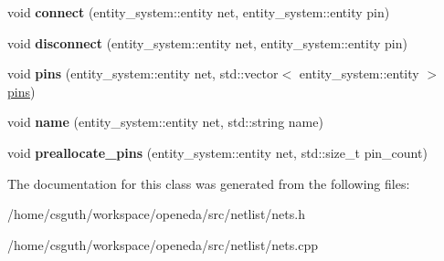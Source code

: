 \begin{DoxyCompactItemize}
\item 
\hypertarget{classophidian_1_1netlist_1_1nets_afe4fb6dd59ab36b9d6619223f9e5dbab}{void {\bfseries connect} (entity\-\_\-system\-::entity net, entity\-\_\-system\-::entity pin)}\label{classophidian_1_1netlist_1_1nets_afe4fb6dd59ab36b9d6619223f9e5dbab}

\item 
\hypertarget{classophidian_1_1netlist_1_1nets_a903c66cc5a191f8d0916a9719618f7df}{void {\bfseries disconnect} (entity\-\_\-system\-::entity net, entity\-\_\-system\-::entity pin)}\label{classophidian_1_1netlist_1_1nets_a903c66cc5a191f8d0916a9719618f7df}

\item 
\hypertarget{classophidian_1_1netlist_1_1nets_a24ef9c3e4d174ac7930f88b94f52ee43}{void {\bfseries pins} (entity\-\_\-system\-::entity net, std\-::vector$<$ entity\-\_\-system\-::entity $>$ \hyperlink{classophidian_1_1netlist_1_1pins}{pins})}\label{classophidian_1_1netlist_1_1nets_a24ef9c3e4d174ac7930f88b94f52ee43}

\item 
\hypertarget{classophidian_1_1netlist_1_1nets_a933f9efaecb385ca94e15abd2a6e448a}{void {\bfseries name} (entity\-\_\-system\-::entity net, std\-::string name)}\label{classophidian_1_1netlist_1_1nets_a933f9efaecb385ca94e15abd2a6e448a}

\item 
\hypertarget{classophidian_1_1netlist_1_1nets_a20f57391f9e0e74005f2ef919b550eef}{void {\bfseries preallocate\-\_\-pins} (entity\-\_\-system\-::entity net, std\-::size\-\_\-t pin\-\_\-count)}\label{classophidian_1_1netlist_1_1nets_a20f57391f9e0e74005f2ef919b550eef}

\end{DoxyCompactItemize}


The documentation for this class was generated from the following files\-:\begin{DoxyCompactItemize}
\item 
/home/csguth/workspace/openeda/src/netlist/nets.\-h\item 
/home/csguth/workspace/openeda/src/netlist/nets.\-cpp\end{DoxyCompactItemize}
